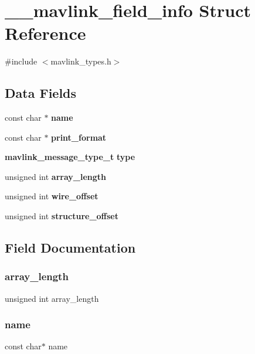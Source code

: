 \section{\+\_\+\+\_\+mavlink\+\_\+field\+\_\+info Struct Reference}
\label{struct____mavlink__field__info}


{\ttfamily \#include $<$mavlink\+\_\+types.\+h$>$}

\subsection*{Data Fields}
\begin{DoxyCompactItemize}
\item 
const char $\ast$ \textbf{ name}
\item 
const char $\ast$ \textbf{ print\+\_\+format}
\item 
\textbf{ mavlink\+\_\+message\+\_\+type\+\_\+t} \textbf{ type}
\item 
unsigned int \textbf{ array\+\_\+length}
\item 
unsigned int \textbf{ wire\+\_\+offset}
\item 
unsigned int \textbf{ structure\+\_\+offset}
\end{DoxyCompactItemize}


\subsection{Field Documentation}
\mbox{\label{struct____mavlink__field__info_acc3a5ec7746f41df8d8f46f12c95c7a0}} 
\subsubsection{array\+\_\+length}
{\footnotesize\ttfamily unsigned int array\+\_\+length}

\mbox{\label{struct____mavlink__field__info_a8f8f80d37794cde9472343e4487ba3eb}} 
\subsubsection{name}
{\footnotesize\ttfamily const char$\ast$ name}

